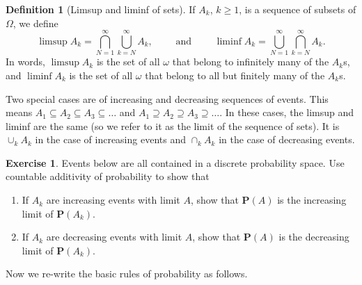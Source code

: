 \documentclass[preprint,  11pt]{amsart}
\theoremstyle{plain} %
\theoremstyle{definition} %
\newtheorem{definition}[theorem]{Definition}
\newtheorem{exercise}[theorem]{Exercise}
\begin{document}
\begin{definition}[Limsup and liminf of sets] If $A_{k}$, $k\ge 1$, is a sequence of subsets of $\Omega$, we define 
\begin{equation*}
\limsup A_{k}=\bigcap_{N=1}^{\infty}\bigcup_{k=N}^{\infty}A_{k}, \qquad \mbox{ and } \qquad  \liminf A_{k}=\bigcup_{N=1}^{\infty}\bigcap_{k=N}^{\infty}A_{k}.
\end{equation*}
In words, $\limsup A_{k}$ is the set of all $\omega$ that belong to infinitely many of the $A_{k}$s, and $\liminf A_{k}$ is the set of all $\omega$ that belong to all but finitely many of the $A_{k}$s. 

Two special cases are of increasing and decreasing sequences of events. This means $A_{1}\subseteq A_{2}\subseteq A_{3}\subseteq \ldots$ and $A_{1}\supseteq A_{2}\supseteq A_{3}\supseteq \ldots$. In these cases, the limsup and liminf are the same (so we refer to it as the limit of the sequence of sets). It is $\cup_{k}A_{k}$ in the case of increasing events and $\cap_{k}A_{k}$ in the case of decreasing events.
\end{definition}

\begin{exercise} Events below are all contained in a discrete probability space. Use countable additivity of probability to show that
\begin{enumerate}\setlength\itemsep{6pt}
\item If $A_{k}$ are increasing events with limit $A$, show that $\mathbf{P}(A)$ is the increasing limit of $\mathbf{P}(A_{k})$. 
\item If $A_{k}$ are decreasing events with limit $A$, show that $\mathbf{P}(A)$ is the decreasing limit of $\mathbf{P}(A_{k})$. 
\end{enumerate}
\end{exercise}  
Now we re-write the basic rules of probability as follows.
\end{document}
